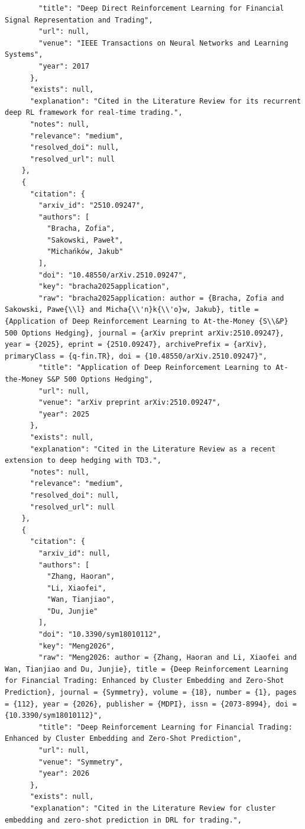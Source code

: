\documentclass[11pt]{article}
\begin{document}
\begin{verbatim}
        "title": "Deep Direct Reinforcement Learning for Financial Signal Representation and Trading",
        "url": null,
        "venue": "IEEE Transactions on Neural Networks and Learning Systems",
        "year": 2017
      },
      "exists": null,
      "explanation": "Cited in the Literature Review for its recurrent deep RL framework for real-time trading.",
      "notes": null,
      "relevance": "medium",
      "resolved_doi": null,
      "resolved_url": null
    },
    {
      "citation": {
        "arxiv_id": "2510.09247",
        "authors": [
          "Bracha, Zofia",
          "Sakowski, Paweł",
          "Michańków, Jakub"
        ],
        "doi": "10.48550/arXiv.2510.09247",
        "key": "bracha2025application",
        "raw": "bracha2025application: author = {Bracha, Zofia and Sakowski, Pawe{\\l} and Micha{\\'n}k{\\'o}w, Jakub}, title = {Application of Deep Reinforcement Learning to At-the-Money {S\\&P} 500 Options Hedging}, journal = {arXiv preprint arXiv:2510.09247}, year = {2025}, eprint = {2510.09247}, archivePrefix = {arXiv}, primaryClass = {q-fin.TR}, doi = {10.48550/arXiv.2510.09247}",
        "title": "Application of Deep Reinforcement Learning to At-the-Money S&P 500 Options Hedging",
        "url": null,
        "venue": "arXiv preprint arXiv:2510.09247",
        "year": 2025
      },
      "exists": null,
      "explanation": "Cited in the Literature Review as a recent extension to deep hedging with TD3.",
      "notes": null,
      "relevance": "medium",
      "resolved_doi": null,
      "resolved_url": null
    },
    {
      "citation": {
        "arxiv_id": null,
        "authors": [
          "Zhang, Haoran",
          "Li, Xiaofei",
          "Wan, Tianjiao",
          "Du, Junjie"
        ],
        "doi": "10.3390/sym18010112",
        "key": "Meng2026",
        "raw": "Meng2026: author = {Zhang, Haoran and Li, Xiaofei and Wan, Tianjiao and Du, Junjie}, title = {Deep Reinforcement Learning for Financial Trading: Enhanced by Cluster Embedding and Zero-Shot Prediction}, journal = {Symmetry}, volume = {18}, number = {1}, pages = {112}, year = {2026}, publisher = {MDPI}, issn = {2073-8994}, doi = {10.3390/sym18010112}",
        "title": "Deep Reinforcement Learning for Financial Trading: Enhanced by Cluster Embedding and Zero-Shot Prediction",
        "url": null,
        "venue": "Symmetry",
        "year": 2026
      },
      "exists": null,
      "explanation": "Cited in the Literature Review for cluster embedding and zero-shot prediction in DRL for trading.",

\end{verbatim}
\end{document}
